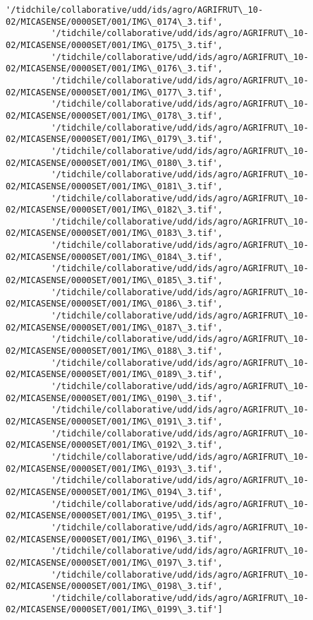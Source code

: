 \documentclass[11pt]{article}
\begin{document}
\begin{Verbatim}[commandchars=\\\{\}]
         '/tidchile/collaborative/udd/ids/agro/AGRIFRUT\_10-02/MICASENSE/0000SET/001/IMG\_0174\_3.tif',
         '/tidchile/collaborative/udd/ids/agro/AGRIFRUT\_10-02/MICASENSE/0000SET/001/IMG\_0175\_3.tif',
         '/tidchile/collaborative/udd/ids/agro/AGRIFRUT\_10-02/MICASENSE/0000SET/001/IMG\_0176\_3.tif',
         '/tidchile/collaborative/udd/ids/agro/AGRIFRUT\_10-02/MICASENSE/0000SET/001/IMG\_0177\_3.tif',
         '/tidchile/collaborative/udd/ids/agro/AGRIFRUT\_10-02/MICASENSE/0000SET/001/IMG\_0178\_3.tif',
         '/tidchile/collaborative/udd/ids/agro/AGRIFRUT\_10-02/MICASENSE/0000SET/001/IMG\_0179\_3.tif',
         '/tidchile/collaborative/udd/ids/agro/AGRIFRUT\_10-02/MICASENSE/0000SET/001/IMG\_0180\_3.tif',
         '/tidchile/collaborative/udd/ids/agro/AGRIFRUT\_10-02/MICASENSE/0000SET/001/IMG\_0181\_3.tif',
         '/tidchile/collaborative/udd/ids/agro/AGRIFRUT\_10-02/MICASENSE/0000SET/001/IMG\_0182\_3.tif',
         '/tidchile/collaborative/udd/ids/agro/AGRIFRUT\_10-02/MICASENSE/0000SET/001/IMG\_0183\_3.tif',
         '/tidchile/collaborative/udd/ids/agro/AGRIFRUT\_10-02/MICASENSE/0000SET/001/IMG\_0184\_3.tif',
         '/tidchile/collaborative/udd/ids/agro/AGRIFRUT\_10-02/MICASENSE/0000SET/001/IMG\_0185\_3.tif',
         '/tidchile/collaborative/udd/ids/agro/AGRIFRUT\_10-02/MICASENSE/0000SET/001/IMG\_0186\_3.tif',
         '/tidchile/collaborative/udd/ids/agro/AGRIFRUT\_10-02/MICASENSE/0000SET/001/IMG\_0187\_3.tif',
         '/tidchile/collaborative/udd/ids/agro/AGRIFRUT\_10-02/MICASENSE/0000SET/001/IMG\_0188\_3.tif',
         '/tidchile/collaborative/udd/ids/agro/AGRIFRUT\_10-02/MICASENSE/0000SET/001/IMG\_0189\_3.tif',
         '/tidchile/collaborative/udd/ids/agro/AGRIFRUT\_10-02/MICASENSE/0000SET/001/IMG\_0190\_3.tif',
         '/tidchile/collaborative/udd/ids/agro/AGRIFRUT\_10-02/MICASENSE/0000SET/001/IMG\_0191\_3.tif',
         '/tidchile/collaborative/udd/ids/agro/AGRIFRUT\_10-02/MICASENSE/0000SET/001/IMG\_0192\_3.tif',
         '/tidchile/collaborative/udd/ids/agro/AGRIFRUT\_10-02/MICASENSE/0000SET/001/IMG\_0193\_3.tif',
         '/tidchile/collaborative/udd/ids/agro/AGRIFRUT\_10-02/MICASENSE/0000SET/001/IMG\_0194\_3.tif',
         '/tidchile/collaborative/udd/ids/agro/AGRIFRUT\_10-02/MICASENSE/0000SET/001/IMG\_0195\_3.tif',
         '/tidchile/collaborative/udd/ids/agro/AGRIFRUT\_10-02/MICASENSE/0000SET/001/IMG\_0196\_3.tif',
         '/tidchile/collaborative/udd/ids/agro/AGRIFRUT\_10-02/MICASENSE/0000SET/001/IMG\_0197\_3.tif',
         '/tidchile/collaborative/udd/ids/agro/AGRIFRUT\_10-02/MICASENSE/0000SET/001/IMG\_0198\_3.tif',
         '/tidchile/collaborative/udd/ids/agro/AGRIFRUT\_10-02/MICASENSE/0000SET/001/IMG\_0199\_3.tif']
\end{Verbatim}
            
\end{document}
